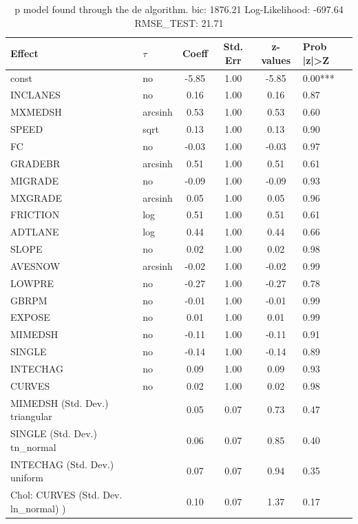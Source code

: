 \begin{table}
	\caption{p model found through the de algorithm. bic: 1876.21 Log-Likelihood: -697.64 RMSE_TEST: 21.71}
	\begin{center}
		\begin{tabular}{|l|l|c|c|c|l|}
			\hline
			Effect & $\tau$ & Coeff & Std. Err & z-values & Prob |z|>Z \\
			\hline
			const & no & -5.85 & 1.00 & -5.85 & 0.00*** \\
			\hline
			INCLANES & no & 0.16 & 1.00 & 0.16 & 0.87 \\
			\hline
			MXMEDSH & arcsinh & 0.53 & 1.00 & 0.53 & 0.60 \\
			\hline
			SPEED & sqrt & 0.13 & 1.00 & 0.13 & 0.90 \\
			\hline
			FC & no & -0.03 & 1.00 & -0.03 & 0.97 \\
			\hline
			GRADEBR & arcsinh & 0.51 & 1.00 & 0.51 & 0.61 \\
			\hline
			MIGRADE & no & -0.09 & 1.00 & -0.09 & 0.93 \\
			\hline
			MXGRADE & arcsinh & 0.05 & 1.00 & 0.05 & 0.96 \\
			\hline
			FRICTION & log & 0.51 & 1.00 & 0.51 & 0.61 \\
			\hline
			ADTLANE & log & 0.44 & 1.00 & 0.44 & 0.66 \\
			\hline
			SLOPE & no & 0.02 & 1.00 & 0.02 & 0.98 \\
			\hline
			AVESNOW & arcsinh & -0.02 & 1.00 & -0.02 & 0.99 \\
			\hline
			LOWPRE & no & -0.27 & 1.00 & -0.27 & 0.78 \\
			\hline
			GBRPM & no & -0.01 & 1.00 & -0.01 & 0.99 \\
			\hline
			EXPOSE & no & 0.01 & 1.00 & 0.01 & 0.99 \\
			\hline
			MIMEDSH & no & -0.11 & 1.00 & -0.11 & 0.91 \\
			\hline
			SINGLE & no & -0.14 & 1.00 & -0.14 & 0.89 \\
			\hline
			INTECHAG & no & 0.09 & 1.00 & 0.09 & 0.93 \\
			\hline
			CURVES & no & 0.02 & 1.00 & 0.02 & 0.98 \\
			\hline
			MIMEDSH (Std. Dev.) triangular &  & 0.05 & 0.07 & 0.73 & 0.47 \\
			\hline
			SINGLE (Std. Dev.) tn_normal &  & 0.06 & 0.07 & 0.85 & 0.40 \\
			\hline
			INTECHAG (Std. Dev.) uniform &  & 0.07 & 0.07 & 0.94 & 0.35 \\
			\hline
			 Chol: CURVES (Std. Dev. ln_normal) ) &  & 0.10 & 0.07 & 1.37 & 0.17 \\
			\hline
		\end{tabular}
	\end{center}
\end{table}